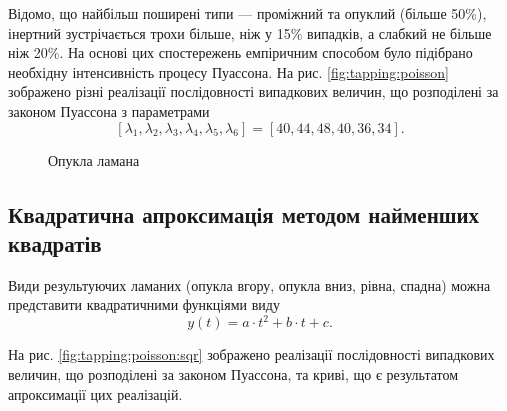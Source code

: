 Відомо, що найбільш поширені типи --- проміжний та опуклий (більше 50\%),
інертний зустрічається трохи більше, ніж у 15\% випадків,
а слабкий не більше ніж 20\%.
На основі цих спостережень емпіричним способом було підібрано необхідну
інтенсивність процесу Пуассона.
На рис. \ref{fig:tapping:poisson} зображено різні реалізації послідовності
випадкових величин, що розподілені за законом Пуассона з параметрами
\begin{equation}\label{eq:tapping:poisson}
  \left[ \lambda_{1}, \lambda_{2}, \lambda_{3}, \lambda_{4}, \lambda_{5},
         \lambda_{6} \right]
  = \left[ 40, 44, 48, 40, 36, 34 \right].
\end{equation}

\begin{figure}[h]
  \centering
  \caption{Опукла ламана}
  \label{fig:tapping:Ilin01}
\end{figure}


\subsection{Квадратична апроксимація методом найменших квадратів}

Види результуючих ламаних (опукла вгору, опукла вниз, рівна, спадна) можна
представити квадратичними функціями виду
\begin{equation*}
  y\left( t \right) = a \cdot t^2 + b \cdot t + c.
\end{equation*}

На рис. \ref{fig:tapping:poisson:sqr} зображено реалізації послідовності
випадкових величин, що розподілені за законом Пуассона, та криві, що є
результатом апроксимації цих реалізацій.

